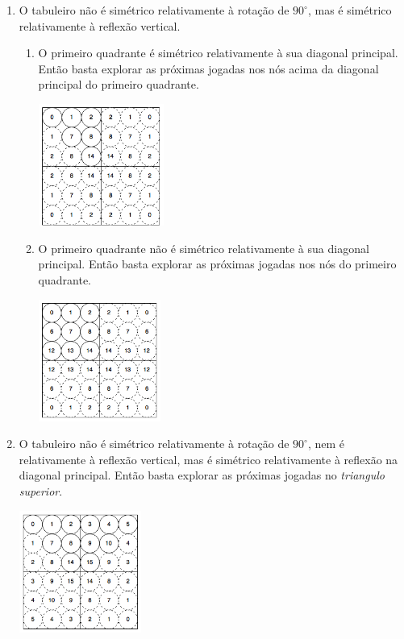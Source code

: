 \begin{enumerate}
\begin{enumerate}
\begin{enumerate}
			\end{enumerate}
			\item O tabuleiro não é simétrico relativamente à rotação de $90^{\circ}$, mas é simétrico relativamente à reflexão vertical.
			\begin{enumerate}
				\item O primeiro quadrante é simétrico relativamente à sua diagonal principal. Então basta explorar as próximas jogadas nos nós acima da diagonal principal do primeiro quadrante.
\begin{table}[H]
\centering
\includegraphics[height=4cm]{images/p180_rv_dp0.png}
\end{table}			
				\item O primeiro quadrante não é simétrico relativamente à sua diagonal principal. Então basta explorar as próximas jogadas nos nós do primeiro quadrante.
\begin{table}[H]
\centering
\includegraphics[height=4cm]{images/p180_rv.png}
\end{table}			
			\end{enumerate}
			\item O tabuleiro não é simétrico relativamente à rotação de $90^{\circ}$, nem é relativamente à reflexão vertical, mas é simétrico relativamente à reflexão na diagonal principal. Então basta explorar as próximas jogadas no \emph{triangulo superior}.
\begin{table}[H]
\centering
\includegraphics[height=4cm]{images/p180_dp.png}

\end{table}
\end{enumerate}
\end{enumerate}

